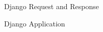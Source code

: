 \documentclass[12pt,a4paper,class,twoside,openany]{report}
\begin{document}
\begin{figure}
\begin{center}
\caption{Django Request and Response}
\label{fg:3-3}
\end{center}
\end{figure}
\begin{figure}
\begin{center}
\caption{Django Application}
\label{fg:3-13}
\end{center}
\end{figure}
\end{document}
